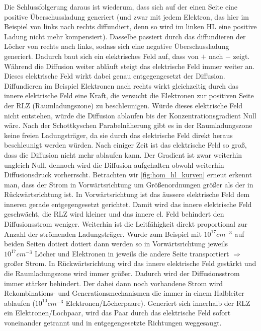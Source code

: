 \documentclass[12pt,a4paper]{report}%
\numberwithin{equation}{section}
\numberwithin{equation}{subsection}
\begin{document}
  Die Schlussfolgerung daraus ist wiederum, dass sich auf der einen Seite eine positive Überschussladung generiert (und zwar mit jedem Elektron, das hier im Beispiel von links nach rechts diffundiert, denn so wird im linken HL eine positive Ladung nicht mehr kompensiert). Dasselbe passiert durch das diffundieren der Löcher von rechts nach links, sodass sich eine negative Überschussladung generiert. Dadurch baut sich ein elektrisches Feld auf, dass von $+$ nach $-$ zeigt. Während die Diffusion weiter abläuft steigt das elektrische Feld immer weiter an. Dieses elektrische Feld wirkt dabei genau entgegengesetzt der Diffusion. Diffundieren im Beispiel Elektronen nach rechts wirkt gleichzeitig durch das innere elektrische Feld eine Kraft, die versucht die Elektronen zur positiven Seite der RLZ (Raumladungszone) zu beschleunigen. Würde dieses elektrische Feld nicht entstehen, würde die Diffusion ablaufen bis der Konzentrationsgradient Null wäre. \newline
  Nach der Schottkyschen Parabelnäherung gibt es in der Raumladungszone keine freien Ladungsträger, da sie durch das elektrische Feld direkt heraus beschleunigt werden würden. Nach einiger Zeit ist das elektrische Feld so groß, dass die Diffusion nicht mehr ablaufen kann. Der Gradient ist zwar weiterhin ungleich Null, dennoch wird die Diffusion aufgehalten obwohl weiterhin Diffusionsdruck vorherrscht. 
  Betrachten wir \eqref{fig:hom_hl_kurven} erneut erkennt man, dass der Strom in Vorwärtsrichtung um Größenordnungen größer als der in Rückwärtsrichtung ist. In Vorwärtsrichtung ist das äussere elektrische Feld dem inneren gerade entgegengesetzt gerichtet. Damit wird das innere elektrische Feld geschwächt, die RLZ wird kleiner und das innere el. Feld behindert den Diffusionsstrom weniger. Weiterhin ist die Leitfähigkeit direkt proportional zur Anzahl der strömenden Ladungsträger. Wurde zum Beispiel mit $10^{17}cm^{-3}$ auf beiden Seiten dotiert dotiert dann werden so in Vorwärtsrichtung jeweils $10^{17}cm^{-3}$ Löcher und Elektronen in jeweils die andere Seite transportiert $\Rightarrow$ großer Strom. \newline
  In Rückwärtsrichtung wird das innere elektrische Feld gestärkt und die Raumladungszone wird immer größer. Dadurch wird der Diffusionsstrom immer stärker behindert. Der dabei dann noch vorhandene Strom wird Rekombinations- und Generationsmechanismen die immer in einem Halbleiter ablaufen ($10^{10} cm^{-3}$ Elektronen/Löcherpaare). Generiert sich innerhalb der RLZ ein Elektronen/Lochpaar, wird das Paar durch das elektrische Feld sofort voneinander getrannt und in entgegengesetzte Richtungen weggesaugt. \newline
\end{document}
